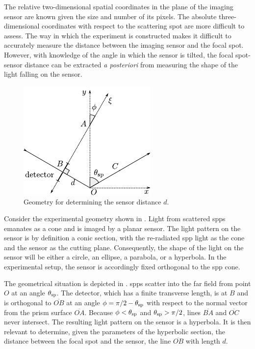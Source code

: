 The relative two-dimensional spatial coordinates in the plane of the
imaging sensor are known given the size and number of its pixels.  The
absolute three-dimensional coordinates with respect to the scattering spot
are more difficult to assess.  The way in which the experiment is
constructed makes it difficult to accurately measure the distance between
the imaging sensor and the focal spot.  However, with knowledge of the
angle in which the sensor is tilted, the focal spot-sensor distance can be extracted
\textit{a posteriori} from measuring the shape of the light falling on the
sensor.
\begin{figure}[ht]
  \centering
  \includegraphics[keepaspectratio,scale=1.25]{figures/hyperbolageoa.pdf}
  \caption{Geometry for determining the sensor distance $d$.}
  \label{fig:propgeo}
\end{figure}

Consider the experimental geometry shown in .
Light from scattered \glspl{spp} emanates as a cone and is imaged by a planar
sensor.  The light pattern on the sensor is by definition a conic section,
with the re-radiated \gls{spp} light as the cone and the sensor as the cutting
plane.  Consequently, the shape of the light on the sensor will be either a
circle, an ellipse, a parabola, or a hyperbola.  In the experimental setup,
the sensor is accordingly fixed orthogonal to the \gls{spp} cone.

The geometrical situation is depicted in .  \glspl{spp}
scatter into the far field from point $O$ at an angle $\theta_\mathrm{sp}$.  The
detector, which has a finite transverse length, is at $B$ and is orthogonal
to $\overline{OB}$ at an angle $\phi=\pi/2-\theta_\mathrm{sp}$ with respect to the
normal vector from the prism surface $\overline{OA}$.  Because
$\phi<\theta_\mathrm{sp}$ and $\theta_\mathrm{sp}>\pi/2$, lines $\overline{BA}$ and
$\overline{OC}$ never intersect. The resulting light pattern on the sensor is a hyperbola.  It is
then relevant to determine, given the parameters of the hyperbolic section,
the distance between the focal spot and the sensor, the line
$\overline{OB}$ with length $d$.

